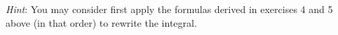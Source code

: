 \documentclass{article}
\begin{document}
\begin{enumerate}
                    \emph{Hint}: You may consider first apply the formulas derived in exercises 4 and 5 above (in that order) to rewrite the integral.

                \end{enumerate}
\end{document}
